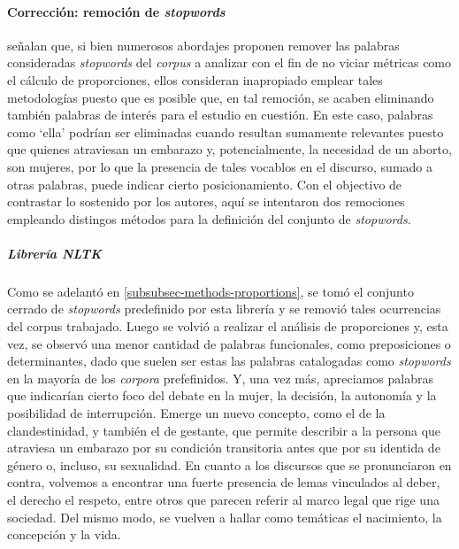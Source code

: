 \paragraph{Corrección: remoción de \textit{stopwords}}
\cite{monroe2008fightin} señalan que, si bien numerosos abordajes proponen remover
las palabras consideradas \textit{stopwords} del \textit{corpus} a analizar con el
fin de no viciar métricas como el cálculo de proporciones, ellos consideran inapropiado
emplear tales metodologías puesto que es posible que, en tal remoción, se acaben
eliminando también palabras de interés para el estudio en cuestión. En este caso,
palabras como `ella' podrían ser eliminadas cuando resultan sumamente relevantes
puesto que quienes atraviesan un embarazo y, potencialmente, la necesidad de un
aborto, son mujeres, por lo que la presencia de tales vocablos en el discurso, sumado
a otras palabras, puede indicar cierto posicionamiento. Con el objectivo de
contrastar lo sostenido por los autores, aquí se intentaron dos remociones empleando
distingos métodos para la definición del conjunto de \textit{stopwords}.

\subparagraph{Librería NLTK}
Como se adelantó en \ref{subsubsec-methods-proportions}, se tomó el conjunto cerrado de
\textit{stopwords} predefinido por esta librería y se removió tales ocurrencias
del corpus trabajado.
Luego se volvió a realizar el análisis de proporciones y, esta
vez, se observó una menor cantidad de palabras funcionales,
como preposiciones o determinantes, dado que suelen ser estas
las palabras catalogadas como \textit{stopwords} en la mayoría de
los \textit{corpora} prefefinidos. Y, una vez más, apreciamos palabras que indicarían
cierto foco del debate en la mujer, la decisión, la autonomía y la posibilidad de
interrupción. Emerge un nuevo concepto, como el de la clandestinidad, y también
el de gestante, que permite describir a la persona que atraviesa un embarazo por
su condición transitoria antes que por su identida de género o, incluso, su
sexualidad.
En cuanto a los discursos que se pronunciaron en contra, volvemos a
encontrar una fuerte presencia de lemas vinculados al deber, el derecho
el respeto, entre otros que parecen referir al marco legal que rige una
sociedad. Del mismo modo, se vuelven a hallar como temáticas el nacimiento,
la concepción y la vida.


